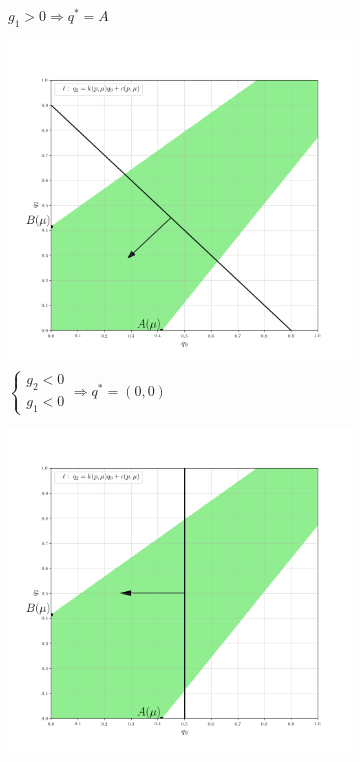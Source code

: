 \begin{flushleft}
\begin{figure}[H]
\begin{subfigure}[b]{0.3 \textwidth}
        	\caption{$g_1 > 0 \Rightarrow q^*=A$}
     	\end{subfigure}
     	\begin{subfigure}[b]{0.3 \textwidth}
        	\centering
        	\includegraphics[width=\textwidth]{images/graf_3_8_0}
        	\caption{$
        	\begin{cases}			
				g_2 < 0 \\
				g_1 < 0
			\end{cases}	\Rightarrow q^*=(0,0)
			$}
     	\end{subfigure}
    	\centering
     	\begin{subfigure}[b]{0.3 \textwidth}
        	\centering
        	\includegraphics[width=\textwidth]{images/graf_3_8_3}

\end{subfigure}
\end{figure}
\end{flushleft}
